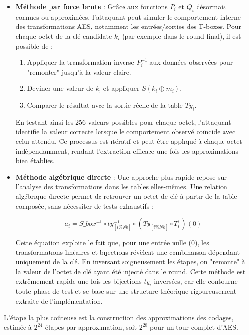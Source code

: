 \documentclass[a4paper, 10pt]{article}
\begin{document}
\begin{itemize}
  \item \textbf{Méthode par force brute} :  
  Grâce aux fonctions $P_i$ et $Q_i$ désormais connues ou approximées, l’attaquant peut simuler le comportement interne des transformations AES, notamment les entrées/sorties des T-boxes.  
  Pour chaque octet de la clé candidate $k_i$ (par exemple dans le round final), il est possible de :
    \begin{enumerate}
      \item Appliquer la transformation inverse $P_i^{-1}$ aux données observées pour "remonter" jusqu’à la valeur claire.
      \item Deviner une valeur de $k_i$ et appliquer $S(k_i \oplus m_i)$.
      \item Comparer le résultat avec la sortie réelle de la table $Ty_i$.
    \end{enumerate}
  En testant ainsi les 256 valeurs possibles pour chaque octet, l’attaquant identifie la valeur correcte lorsque le comportement observé coïncide avec celui attendu.  
  Ce processus est itératif et peut être appliqué à chaque octet indépendamment, rendant l’extraction efficace une fois les approximations bien établies.

  \item \textbf{Méthode algébrique directe} :  
  Une approche plus rapide repose sur l’analyse des transformations dans les tables elles-mêmes. Une relation algébrique directe permet de retrouver un octet de clé à partir de la table composée, sans nécessiter de tests exhaustifs :

  \[
    a_{i} = S\_box^{-1} \circ ty_{[i \% Nb]}^{-1} \circ (Ty_{[i \% Nb]} \circ T_{i}^{1})(0)
  \]

  Cette équation exploite le fait que, pour une entrée nulle (0), les transformations linéaires et bijections révèlent une combinaison dépendant uniquement de la clé. En inversant soigneusement les étapes, on "remonte" à la valeur de l’octet de clé ayant été injecté dans le round.  
  Cette méthode est extrêmement rapide une fois les bijections $ty_i$ inversées, car elle contourne toute phase de test et se base sur une structure théorique rigoureusement extraite de l’implémentation.
\end{itemize}

L'étape la plus coûteuse est la construction des approximations des codages, estimée à $2^{24}$ étapes par 
approximation, soit $2^{28}$ pour un tour complet d’AES.
\end{document}
